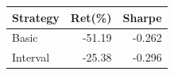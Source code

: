 {\tiny\setlength{\tabcolsep}{2pt}\begin{tabular}{lrr} \toprule
Strategy & Ret(\%) & Sharpe \\ \midrule
Basic & -51.19 & -0.262 \\ 
Interval & -25.38 & -0.296 \\ 
\bottomrule \end{tabular}}